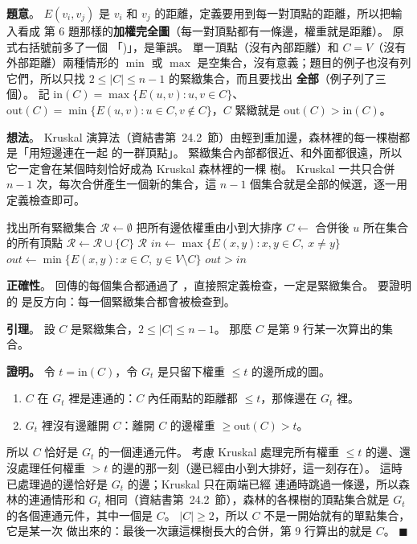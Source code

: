 \begin{pastsoln}
\textbf{題意}。 $E(v_i, v_j)$ 是 $v_i$ 和 $v_j$ 的距離，定義要用到每一對頂點的距離，所以把輸入看成
第 6 題那樣的\textbf{加權完全圖}（每一對頂點都有一條邊，權重就是距離）。 原式右括號前多了一個
「)」，是筆誤。 單一頂點（沒有內部距離）和 $C = V$（沒有外部距離）兩種情形的 $\min$ 或 $\max$
是空集合，沒有意義；題目的例子也沒有列它們，所以只找 $2 \le |C| \le n - 1$ 的緊緻集合，而且要找出
\textbf{全部}（例子列了三個）。 記 $\mathrm{in}(C) = \max\{E(u, v) : u, v \in C\}$、
$\mathrm{out}(C) = \min\{E(u, v) : u \in C, v \notin C\}$，$C$ 緊緻就是 $\mathrm{out}(C) > \mathrm{in}(C)$。

\textbf{想法}。 Kruskal 演算法（資結書第~24.2~節）由輕到重加邊，森林裡的每一棵樹都是「用短邊連在一起
的一群頂點」。 緊緻集合內部都很近、和外面都很遠，所以它一定會在某個時刻恰好成為 Kruskal 森林裡的一棵
樹。 Kruskal 一共只合併 $n - 1$ 次，每次合併產生一個新的集合，這 $n - 1$ 個集合就是全部的候選，逐一用
定義檢查即可。

\begin{pseudo}{找出所有緊緻集合}
    \State $\mathcal{R} \gets \emptyset$
        \State {}
    \EndFor
    \State 把所有邊依權重由小到大排序
            \State {}
            \State $C \gets$ 合併後 $u$ 所在集合的所有頂點
                \State $\mathcal{R} \gets \mathcal{R} \cup \{C\}$
            \EndIf
        \EndIf
    \EndFor
    \State \Return $\mathcal{R}$
\EndFunction
\Statex
{}
    \State $\mathit{in} \gets \max\{E(x, y) : x, y \in C,\ x \ne y\}$
    \State $\mathit{out} \gets \min\{E(x, y) : x \in C,\ y \in V \setminus C\}$
    \State \Return $\mathit{out} > \mathit{in}$
\EndFunction
\end{pseudo}

\textbf{正確性}。 回傳的每個集合都通過了 ，直接照定義檢查，一定是緊緻集合。 要證明的
是反方向：每一個緊緻集合都會被檢查到。

\textbf{引理}。 設 $C$ 是緊緻集合，$2 \le |C| \le n - 1$。 那麼 $C$ 是第 9 行某一次算出的集合。

\textbf{證明。} 令 $t = \mathrm{in}(C)$，令 $G_t$ 是只留下權重 $\le t$ 的邊所成的圖。
\begin{enumerate}
\item $C$ 在 $G_t$ 裡是連通的：$C$ 內任兩點的距離都 $\le t$，那條邊在 $G_t$ 裡。
\item $G_t$ 裡沒有邊離開 $C$：離開 $C$ 的邊權重 $\ge \mathrm{out}(C) > t$。
\end{enumerate}
所以 $C$ 恰好是 $G_t$ 的一個連通元件。 考慮 Kruskal 處理完所有權重 $\le t$ 的邊、還沒處理任何權重 $> t$
的邊的那一刻（邊已經由小到大排好，這一刻存在）。 這時已處理過的邊恰好是 $G_t$ 的邊；Kruskal 只在兩端已經
連通時跳過一條邊，所以森林的連通情形和 $G_t$ 相同（資結書第~24.2~節），森林的各棵樹的頂點集合就是 $G_t$
的各個連通元件，其中一個是 $C$。 $|C| \ge 2$，所以 $C$ 不是一開始就有的單點集合，它是某一次 
做出來的：最後一次讓這棵樹長大的合併，第 9 行算出的就是 $C$。 \hfill$\blacksquare$


\end{pastsoln}
